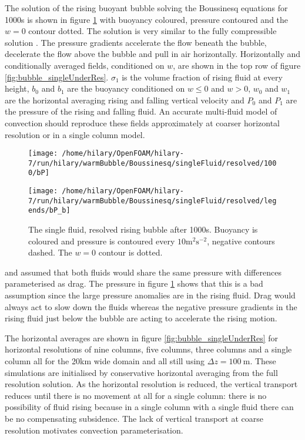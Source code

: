 \documentclass[draft]{agujournal2019}
\begin{document}
The solution of the rising buoyant bubble solving the Boussinesq equations
for 1000s is shown in figure \ref{fig:bubble} with buoyancy coloured,
pressure contoured and the $w=0$ contour dotted. The solution is
very similar to the fully compressible solution \cite{BF02}. The
pressure gradients accelerate the flow beneath the bubble, decelerate
the flow above the bubble and pull in air horizontally. Horizontally
and conditionally averaged fields, conditioned on $w$, are shown
in the top row of figure \ref{fig:bubble_singleUnderRes}. $\sigma_{1}$
is the volume fraction of rising fluid at every height, $b_{0}$ and
$b_{1}$ are the buoyancy conditioned on $w\le0$ and $w>0$, $w_{0}$
and $w_{1}$ are the horizontal averaging rising and falling vertical
velocity and $P_{0}$ and $P_{1}$ are the pressure of the rising
and falling fluid. An accurate multi-fluid model of convection should
reproduce these fields approximately at coarser horizontal resolution
or in a single column model. 

\begin{figure}
\noindent \begin{centering}
\texttt{[image: /home/hilary/OpenFOAM/hilary-7/run/hilary/warmBubble/Boussinesq/singleFluid/resolved/1000/bP]}
\par\end{centering}
\noindent \begin{centering}
\texttt{[image: /home/hilary/OpenFOAM/hilary-7/run/hilary/warmBubble/Boussinesq/singleFluid/resolved/legends/bP\_b]}
\par\end{centering}
\caption{The single fluid, resolved rising bubble after 1000s. Buoyancy is
coloured and pressure is contoured every $10\text{m}^{2}\text{s}^{-2}$,
negative contours dashed. The $w=0$ contour is dotted. \label{fig:bubble}}
\end{figure}

 and  assumed that both fluids would share
the same pressure with differences parameterised as drag. The pressure
in figure \ref{fig:bubble} shows that this is a bad assumption since
the large pressure anomalies are in the rising fluid. Drag would always
act to slow down the fluids whereas the negative pressure gradients
in the rising fluid just below the bubble are acting to accelerate
the rising motion. 

The horizontal averages are shown in figure \ref{fig:bubble_singleUnderRes}
for horizontal resolutions of nine columns, five columns, three columns
and a single column all for the 20km wide domain and all still using
$\Delta z=100\ \text{m}$. These simulations are initialised by conservative
horizontal averaging from the full resolution solution. As the horizontal
resolution is reduced, the vertical transport reduces until there
is no movement at all for a single column: there is no possibility
of fluid rising because in a single column with a single fluid there
can be no compensating subsidence. The lack of vertical transport
at coarse resolution motivates convection parameterisation. 
\end{document}
